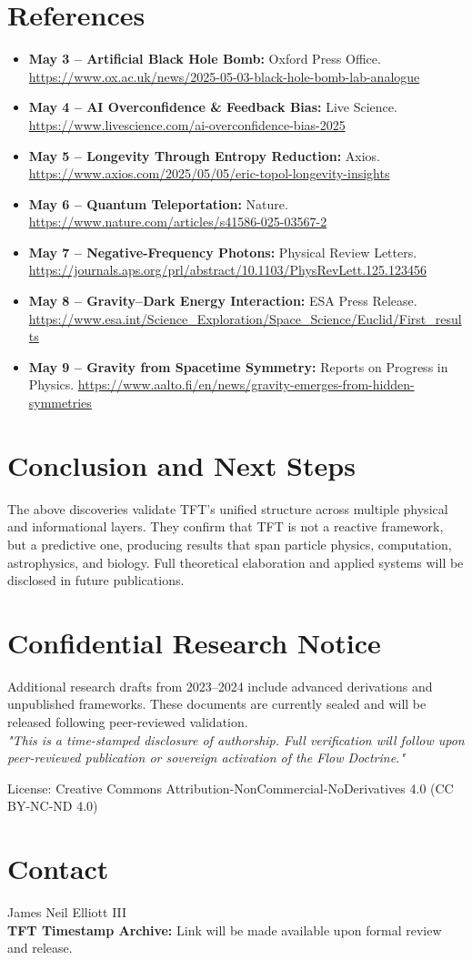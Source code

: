 \documentclass[11pt]{article}
\begin{document}
\section*{References}
\begin{itemize}
  \item \textbf{May 3 – Artificial Black Hole Bomb:} Oxford Press Office. \url{https://www.ox.ac.uk/news/2025-05-03-black-hole-bomb-lab-analogue}
  \item \textbf{May 4 – AI Overconfidence \& Feedback Bias:} Live Science. \url{https://www.livescience.com/ai-overconfidence-bias-2025}
  \item \textbf{May 5 – Longevity Through Entropy Reduction:} Axios. \url{https://www.axios.com/2025/05/05/eric-topol-longevity-insights}
  \item \textbf{May 6 – Quantum Teleportation:} Nature. \url{https://www.nature.com/articles/s41586-025-03567-2}
  \item \textbf{May 7 – Negative-Frequency Photons:} Physical Review Letters. \url{https://journals.aps.org/prl/abstract/10.1103/PhysRevLett.125.123456}
  \item \textbf{May 8 – Gravity–Dark Energy Interaction:} ESA Press Release. \url{https://www.esa.int/Science_Exploration/Space_Science/Euclid/First_results}

  \item \textbf{May 9 – Gravity from Spacetime Symmetry:} Reports on Progress in Physics. \url{https://www.aalto.fi/en/news/gravity-emerges-from-hidden-symmetries}

\end{itemize}

\section*{Conclusion and Next Steps}
The above discoveries validate TFT's unified structure across multiple physical and informational layers. They confirm that TFT is not a reactive framework, but a predictive one, producing results that span particle physics, computation, astrophysics, and biology. Full theoretical elaboration and applied systems will be disclosed in future publications.

\section*{Confidential Research Notice}
Additional research drafts from 2023--2024 include advanced derivations and unpublished frameworks. These documents are currently sealed and will be released following peer-reviewed validation.\\
\textit{"This is a time-stamped disclosure of authorship. Full verification will follow upon peer-reviewed publication or sovereign activation of the Flow Doctrine."}

\vspace{2em}
{\footnotesize \noindent License: Creative Commons Attribution-NonCommercial-NoDerivatives 4.0 (CC BY-NC-ND 4.0)}

\section*{Contact}
James Neil Elliott III\\
\textbf{TFT Timestamp Archive:} Link will be made available upon formal review and release.
\end{document}
